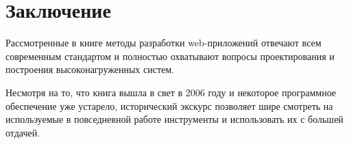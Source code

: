\chapter*{Заключение}						%

Рассмотренные в книге методы разработки web-приложений отвечают всем современным стандартом и полностью охватывают вопросы  проектирования и построения высоконагруженных систем. 

Несмотря на то, что книга вышла в свет в 2006 году и некоторое программное обеспечение уже устарело, исторический экскурс позволяет шире смотреть на используемые в повседневной работе инструменты и использовать их с большей отдачей.


\clearpage